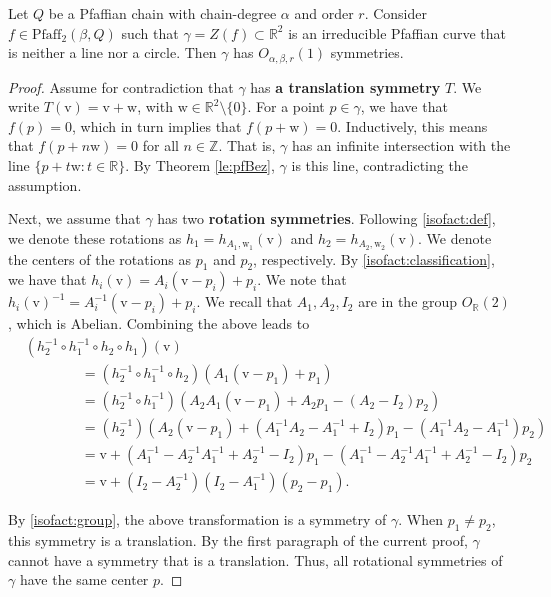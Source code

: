 \documentclass[11pt]{article}
\theoremstyle{definition}
\newcommand{\RR}{\mathbb R}
\newcommand{\ZZ}{\mathbb Z}
\newcommand{\Pf}{\mathrm{Pfaff}}
\newcommand*{\vecw}{\mathrm{w}}
\newcommand*{\vecv}{\mathrm{v}}
\begin{document}
\begin{lemma}\label{lem:syms}
Let $Q$ be a Pfaffian chain with chain-degree $\alpha$ and order $r$. 
Consider $f \in \Pf_2(\beta, Q)$ such that $\gamma= Z(f)\subset \RR^2$ is an irreducible Pfaffian curve that is neither a line nor a circle. Then $\gamma$ has $O_{\alpha,\beta,r}(1)$ symmetries.
\end{lemma}
\begin{proof}
Assume for contradiction that $\gamma$ has {\bf a translation symmetry} $T$.
We write $T(\vecv) = \vecv+\vecw$, with $\vecw\in \RR^2\setminus \{0\}$. 
For a point $p\in \gamma$, we have that $f(p) = 0$, which in turn implies that $f(p+\vecw)=0$. 
Inductively, this means that $f(p + n\vecw) = 0$ for all $n \in \ZZ$. 
That is, $\gamma$ has an infinite intersection with the line $\{p + t\vecw : t\in \RR \}$.
By Theorem \ref{le:pfBez}, $\gamma$ is this line, contradicting the assumption.  
  
Next, we assume that $\gamma$ has two {\bf rotation symmetries}.
Following \ref{isofact:def}, we denote these rotations as $h_1=h_{A_1, \vecw_1}(\vecv)$ and $h_2=h_{A_2, \vecw_2}(\vecv)$.
We denote the centers of the rotations as $p_1$ and $p_2$, respectively.
By \ref{isofact:classification}, we have that $h_{i}(\vecv) = A_i(\vecv-p_i) + p_i$. 
We note that $h_{i}(\vecv)^{-1} = A_i^{-1}(\vecv-p_i) + p_i$.
We recall that $A_1,A_2,I_2$ are in the group $O_\RR(2)$, which is Abelian. 
Combining the above leads to
  \begin{align*}
 &(h_2^{-1} \circ h_1^{-1} \circ h_2 \circ h_1)(\vecv) \nonumber \\
 &\qquad \qquad = (h_2^{-1} \circ h_1^{-1} \circ h_2)(A_1(\vecv - p_1) + p_1) \nonumber \\
 &\qquad \qquad = (h_2^{-1} \circ h_1^{-1})(A_2A_1(\vecv - p_1) + A_2 p_1 - (A_2 - I_2)p_2) \nonumber \\
 &\qquad \qquad = (h_2^{-1})(A_2(\vecv - p_1) + (A_1^{-1}A_2 - A_1^{-1} + I_2)p_1 - (A_1^{-1}A_2 - A_1^{-1})p_2) \nonumber \\
 &\qquad \qquad = \vecv + (A_1^{-1} - A_2^{-1}A_1^{-1} + A_2^{-1} - I_2) p_1 - (A_1^{-1} - A_2^{-1}A_1^{-1} + A_2^{-1} - I_2) p_2 \nonumber \\
 &\qquad \qquad = \vecv + (I_2 - A_2^{-1})(I_2 - A_1^{-1})(p_2 -p_1). \nonumber
 \end{align*}

By \ref{isofact:group}, the above transformation is a symmetry of $\gamma$.
When $p_1\neq p_2$, this symmetry is a translation. 
By the first paragraph of the current proof, $\gamma$ cannot have a symmetry that is a translation.
Thus, all rotational symmetries of $\gamma$ have the same center $p$.


\end{proof}
\end{document}
